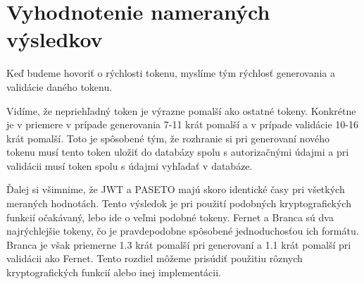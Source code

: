 \begin{table}
  \begin{center}
    \caption{Namerané rýchlosti spracovania požiadavky}
    \label{tab:api_porovnanie} %

  \end{center}
\end{table}

\section{Vyhodnotenie nameraných výsledkov}
\label{sec:vyhodnotenie}

Keď budeme hovoriť o rýchlosti tokenu, myslíme tým rýchlosť generovania a validácie daného tokenu. 

Vidíme, že nepriehľadný token je výrazne pomalší ako ostatné tokeny. Konkrétne je v priemere v prípade generovania 7-11 krát pomalší a v prípade validácie 10-16 krát pomalší. Toto je spôsobené tým, že rozhranie si pri generovaní nového tokenu musí tento token uložiť do databázy spolu s autorizačnými údajmi a pri validácii musí token spolu s údajmi vyhľadať v databáze.

Ďalej si všimnime, že JWT a PASETO majú skoro identické časy pri všetkých meraných hodnotách. Tento výsledok je pri použití podobných kryptografických funkcií očakávaný, lebo ide o veľmi podobné tokeny. Fernet a Branca sú dva najrýchlejšie tokeny, čo je pravdepodobne spôsobené jednoduchosťou ich formátu. Branca je však priemerne 1.3 krát pomalší pri generovaní a 1.1 krát pomalší pri validácii ako Fernet. Tento rozdiel môžeme prisúdiť použitiu rôznych kryptografických funkcií alebo inej implementácii.


